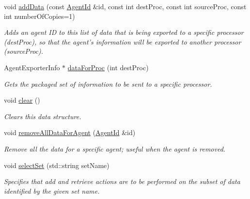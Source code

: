 \begin{DoxyCompactItemize}
\item 
\hypertarget{classrepast_1_1_agent_exporter_data_a68c868fec5c36fa93a92a30dffaca831}{void \hyperlink{classrepast_1_1_agent_exporter_data_a68c868fec5c36fa93a92a30dffaca831}{add\-Data} (const \hyperlink{classrepast_1_1_agent_id}{Agent\-Id} \&id, const int dest\-Proc, const int source\-Proc, const int number\-Of\-Copies=1)}\label{classrepast_1_1_agent_exporter_data_a68c868fec5c36fa93a92a30dffaca831}

\begin{DoxyCompactList}\small\item\em Adds an agent I\-D to this list of data that is being exported to a specific processor (dest\-Proc), so that the agent's information will be exported to another processor (source\-Proc). \end{DoxyCompactList}\item 
\hypertarget{classrepast_1_1_agent_exporter_data_a9fdf268329053c764be760549ccdd6d7}{Agent\-Exporter\-Info $\ast$ \hyperlink{classrepast_1_1_agent_exporter_data_a9fdf268329053c764be760549ccdd6d7}{data\-For\-Proc} (int dest\-Proc)}\label{classrepast_1_1_agent_exporter_data_a9fdf268329053c764be760549ccdd6d7}

\begin{DoxyCompactList}\small\item\em Gets the packaged set of information to be sent to a specific processor. \end{DoxyCompactList}\item 
\hypertarget{classrepast_1_1_agent_exporter_data_a4b7e8a7d438345fdb9dc05adc81abbf3}{void \hyperlink{classrepast_1_1_agent_exporter_data_a4b7e8a7d438345fdb9dc05adc81abbf3}{clear} ()}\label{classrepast_1_1_agent_exporter_data_a4b7e8a7d438345fdb9dc05adc81abbf3}

\begin{DoxyCompactList}\small\item\em Clears this data structure. \end{DoxyCompactList}\item 
\hypertarget{classrepast_1_1_agent_exporter_data_a24802b60c1947b1e3d76d027360c7263}{void \hyperlink{classrepast_1_1_agent_exporter_data_a24802b60c1947b1e3d76d027360c7263}{remove\-All\-Data\-For\-Agent} (\hyperlink{classrepast_1_1_agent_id}{Agent\-Id} \&id)}\label{classrepast_1_1_agent_exporter_data_a24802b60c1947b1e3d76d027360c7263}

\begin{DoxyCompactList}\small\item\em Remove all the data for a specific agent; useful when the agent is removed. \end{DoxyCompactList}\item 
void \hyperlink{classrepast_1_1_agent_exporter_data_a6b3ec37213eb4a2b76d485144e6bcc4c}{select\-Set} (std\-::string set\-Name)
\begin{DoxyCompactList}\small\item\em Specifies that add and retrieve actions are to be performed on the subset of data identified by the given set name. \end{DoxyCompactList}\end{DoxyCompactItemize}


